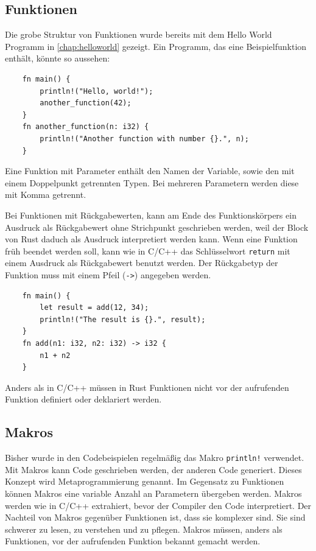 \subsection{Funktionen}\label{chap:functions}

Die grobe Struktur von Funktionen wurde bereits mit dem Hello World Programm in \autoref{chap:helloworld} gezeigt. Ein Programm, das eine Beispielfunktion enthält, könnte so aussehen:

\begin{lstlisting}
    fn main() {
        println!("Hello, world!");
        another_function(42);
    }
    fn another_function(n: i32) {
        println!("Another function with number {}.", n);
    }
\end{lstlisting}

Eine Funktion mit Parameter enthält den Namen der Variable, sowie den mit einem Doppelpunkt getrennten Typen. Bei mehreren Parametern werden diese mit Komma getrennt.

Bei Funktionen mit Rückgabewerten, kann am Ende des Funktionskörpers ein Ausdruck als Rückgabewert ohne Strichpunkt geschrieben werden, weil der Block von Rust daduch als Ausdruck interpretiert werden kann. Wenn eine Funktion früh beendet werden soll, kann wie in C/C++ das Schlüsselwort \verb"return" mit einem Ausdruck als Rückgabewert benutzt werden. Der Rückgabetyp der Funktion muss mit einem Pfeil (\verb"->") angegeben werden.

\begin{lstlisting}
    fn main() {
        let result = add(12, 34);
        println!("The result is {}.", result);
    }
    fn add(n1: i32, n2: i32) -> i32 {
        n1 + n2
    }
\end{lstlisting}

Anders als in C/C++ müssen in Rust Funktionen nicht vor der aufrufenden Funktion definiert oder deklariert werden.

\subsection{Makros}\label{chap:macros}

Bisher wurde in den Codebeispielen regelmäßig das Makro \verb"println!" verwendet. Mit Makros kann Code geschrieben werden, der anderen Code generiert. Dieses Konzept wird Metaprogrammierung genannt. Im Gegensatz zu Funktionen können Makros eine variable Anzahl an Parametern übergeben werden. Makros werden wie in C/C++ extrahiert, bevor der Compiler den Code interpretiert. Der Nachteil von Makros gegenüber Funktionen ist, dass sie komplexer sind. Sie sind schwerer zu lesen, zu verstehen und zu pflegen. Makros müssen, anders als Funktionen, vor der aufrufenden Funktion bekannt gemacht werden. 

